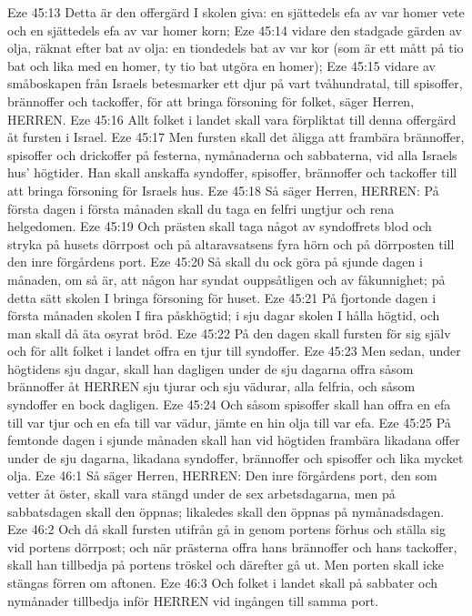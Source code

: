 Eze 45:13  Detta är den offergärd I skolen giva: en sjättedels efa av var homer vete och en sjättedels efa av var homer korn;
Eze 45:14  vidare den stadgade gärden av olja, räknat efter bat av olja: en tiondedels bat av var kor (som är ett mått på tio bat och lika med en homer, ty tio bat utgöra en homer);
Eze 45:15  vidare av småboskapen från Israels betesmarker ett djur på vart tvåhundratal, till spisoffer, brännoffer och tackoffer, för att bringa försoning för folket, säger Herren, HERREN.
Eze 45:16  Allt folket i landet skall vara förpliktat till denna offergärd åt fursten i Israel.
Eze 45:17  Men fursten skall det åligga att frambära brännoffer, spisoffer och drickoffer på festerna, nymånaderna och sabbaterna, vid alla Israels hus' högtider. Han skall anskaffa syndoffer, spisoffer, brännoffer och tackoffer till att bringa försoning för Israels hus.
Eze 45:18  Så säger Herren, HERREN: På första dagen i första månaden skall du taga en felfri ungtjur och rena helgedomen.
Eze 45:19  Och prästen skall taga något av syndoffrets blod och stryka på husets dörrpost och på altaravsatsens fyra hörn och på dörrposten till den inre förgårdens port.
Eze 45:20  Så skall du ock göra på sjunde dagen i månaden, om så är, att någon har syndat ouppsåtligen och av fåkunnighet; på detta sätt skolen I bringa försoning för huset.
Eze 45:21  På fjortonde dagen i första månaden skolen I fira påskhögtid; i sju dagar skolen I hålla högtid, och man skall då äta osyrat bröd.
Eze 45:22  På den dagen skall fursten för sig själv och för allt folket i landet offra en tjur till syndoffer.
Eze 45:23  Men sedan, under högtidens sju dagar, skall han dagligen under de sju dagarna offra såsom brännoffer åt HERREN sju tjurar och sju vädurar, alla felfria, och såsom syndoffer en bock dagligen.
Eze 45:24  Och såsom spisoffer skall han offra en efa till var tjur och en efa till var vädur, jämte en hin olja till var efa.
Eze 45:25  På femtonde dagen i sjunde månaden skall han vid högtiden frambära likadana offer under de sju dagarna, likadana syndoffer, brännoffer och spisoffer och lika mycket olja.
Eze 46:1  Så säger Herren, HERREN: Den inre förgårdens port, den som vetter åt öster, skall vara stängd under de sex arbetsdagarna, men på sabbatsdagen skall den öppnas; likaledes skall den öppnas på nymånadsdagen.
Eze 46:2  Och då skall fursten utifrån gå in genom portens förhus och ställa sig vid portens dörrpost; och när prästerna offra hans brännoffer och hans tackoffer, skall han tillbedja på portens tröskel och därefter gå ut. Men porten skall icke stängas förren om aftonen.
Eze 46:3  Och folket i landet skall på sabbater och nymånader tillbedja inför HERREN vid ingången till samma port.

